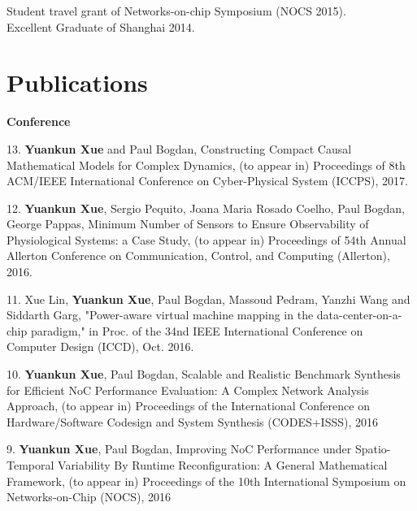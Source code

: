 \documentclass[margin,line]{cv}
\begin{document}
\begin{resume}
    Student travel grant of Networks-on-chip Symposium (NOCS 2015). \\\vspace{1mm}%
    Excellent Graduate of Shanghai 2014.                                                  %



    \section{\mysidestyle Publications}



    \textbf{Conference} \\

    \begin{list}{*}{}
    
    \item [13.] \textbf{Yuankun Xue} and Paul Bogdan, Constructing Compact Causal Mathematical Models for Complex Dynamics​, (to appear in) Proceedings of 8th ACM/IEEE International Conference on Cyber-Physical System (ICCPS), 2017.
    
    \item [12.] \textbf{Yuankun Xue}, Sergio Pequito, Joana Maria Rosado Coelho, Paul Bogdan, George Pappas, Minimum Number of Sensors to Ensure Observability of Physiological Systems: a Case Study, (to appear in) Proceedings of 54th Annual Allerton Conference on Communication, Control, and Computing (Allerton), 2016.
    
\item [11.] Xue Lin, \textbf{Yuankun Xue}, Paul Bogdan, Massoud Pedram, Yanzhi Wang and Siddarth Garg, "Power-aware virtual machine mapping in the data-center-on-a-chip paradigm," in Proc. of the 34nd IEEE International Conference on Computer Design (ICCD), Oct. 2016. 

\item [10.] \textbf{Yuankun Xue}, Paul Bogdan, Scalable and Realistic Benchmark Synthesis for Efficient NoC Performance Evaluation: A Complex Network Analysis Approach, (to appear in) Proceedings of the International Conference on Hardware/Software Codesign and System Synthesis (CODES+ISSS), 2016

\item [9.] \textbf{Yuankun Xue}, Paul Bogdan, Improving NoC Performance under Spatio-Temporal Variability By Runtime Reconfiguration: A General Mathematical Framework, (to appear in) Proceedings of the 10th International Symposium on Networks-on-Chip (NOCS), 2016


\end{list}
\end{resume}
\end{document}
